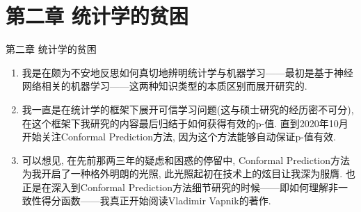 \documentclass[compress,10pt,dvipsnames,notheorems]{beamer} %
\begin{document}
%

\section{第二章 统计学的贫困}
\begin{frame}{第二章 统计学的贫困}
\begin{solu}
\begin{enumerate}
\item 我是在颇为不安地反思如何真切地辨明统计学与机器学习——最初是基于神经网络相关的机器学习——这两种知识类型的本质区别而展开研究的. 

\item 我一直是在统计学的框架下展开可信学习问题(这与硕士研究的经历密不可分), 在这个框架下我研究的内容最后归结于如何获得有效的p-值. 直到2020年10月开始关注Conformal Prediction方法, 因为这个方法能够自动保证p-值有效. 

\item 可以想见, 在先前那两三年的疑虑和困惑的停留中, Conformal Prediction方法为我开启了一种格外明朗的光照, 此光照起初在技术上的炫目让我深为服膺. 也正是在深入到Conformal Prediction方法细节研究的时候——即如何理解非一致性得分函数——我真正开始阅读Vladimir Vapnik的著作.
\end{enumerate}
\end{solu}
\end{frame}
\end{document}

